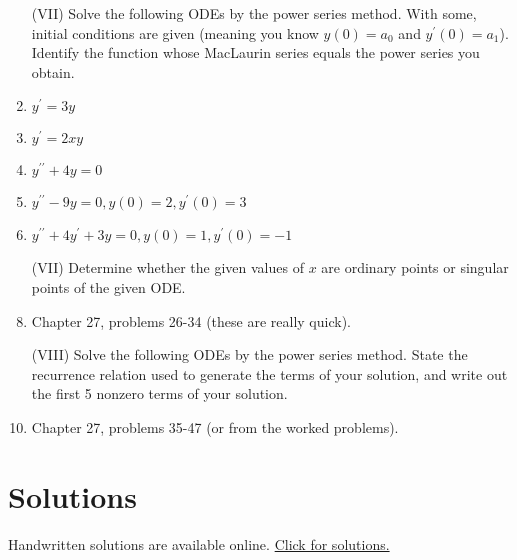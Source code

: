 \begin{multicols}{2}
\begin{enumerate}
\item [(VII)] Solve the following ODEs by the power series method. With some, initial conditions are given (meaning you know $y(0)=a_0$ and $y^\prime(0)=a_1$). Identify the function whose MacLaurin series equals the power series you obtain.
\item $y^{\prime}=3y$
\item $y^{\prime}=2xy$
\item $y^{\prime\prime}+4y=0$
\item $y^{\prime\prime}-9y=0, y(0)=2, y^\prime(0)=3$
\item $y^{\prime\prime}+4y^{\prime}+3y=0, y(0)=1, y^\prime(0)=-1$



\item [(VII)] Determine whether the given values of $x$ are ordinary points or singular points of the given ODE.
\item Chapter 27, problems 26-34 (these are really quick).


\item [(VIII)] Solve the following ODEs by the power series method.  State the recurrence relation used to generate the terms of your solution, and write out the first 5 nonzero terms of your solution.
\item Chapter 27, problems 35-47 (or from the worked problems).






\end{enumerate}

\section{Solutions}
Handwritten solutions are available online.  \href{https://ilearn.byui.edu/bbcswebdav/institution/Physical\_Sci\_Eng/Mathematics/Personal\%20Folders/WoodruffB/316/08-Power-Series-Preparation-Solutions.pdf}{Click for solutions.}

\end{multicols}


